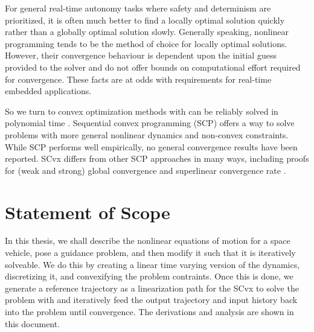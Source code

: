 For general real-time autonomy tasks where safety and determinism are prioritized, it is often much better to find a locally optimal solution quickly rather than a globally optimal solution slowly. Generally speaking, nonlinear programming tends to be the method of choice for locally optimal solutions. However, their convergence behaviour is dependent upon the initial guess provided to the solver and do not offer bounds on computational effort required for convergence. These facts are at odds with requirements for real-time embedded applications.

So we turn to convex optimization methods with can be reliably solved in polynomial time \cite{nesterov1994interior}. Sequential convex programming (SCP) offers a way to solve problems with more general nonlinear dynamics and non-convex constraints. While SCP performs well empirically, no general convergence results have been reported. SCvx differs from other SCP approaches in many ways, including proofs for (weak and strong) global convergence and superlinear convergence rate \cite{mao2016successive}.




\section{Statement of Scope}
In this thesis, we shall describe the nonlinear equations of motion for a space vehicle, pose a guidance problem, and then modify it such that it is iteratively solveable. We do this by creating a linear time varying version of the dynamics, discretizing it, and convexifying the problem contraints. Once this is done, we generate a reference trajectory as a linearization path for the SCvx to solve the problem with and iteratively feed the output trajectory and input history back into the problem until convergence. The derivations and analysis are shown in this document.















